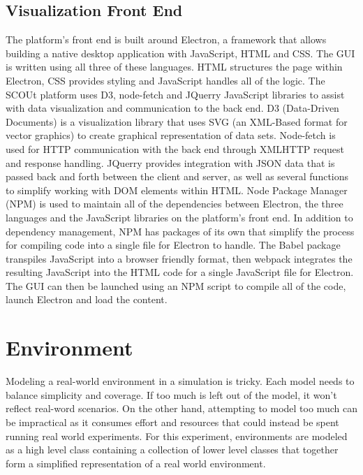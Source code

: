 \subsection{Visualization Front End} \label{subsec:front_end}
The platform's front end is built around Electron,  a framework that allows building a native desktop application with JavaScript, HTML and CSS.
The GUI is written using all three of these languages.
HTML structures the page within Electron, CSS provides styling and JavaScript handles all of the logic.
The SCOUt platform uses D3, node-fetch and JQuerry JavaScript libraries to assist with data visualization and communication to the back end. 
D3 (Data-Driven Documents) is a visualization library that uses SVG (an XML-Based format for vector graphics) to create graphical representation of data sets.
Node-fetch is used for HTTP communication with the back end through XMLHTTP request and response handling.
JQuerry provides integration with JSON data that is passed back and forth between the client and server, as well as several functions to simplify working with DOM elements within HTML.
Node Package Manager (NPM)  is used to maintain all of the dependencies between Electron, the three languages and the JavaScript libraries on the platform's front end.
In addition to dependency management, NPM has packages of its own that simplify the process for compiling code into a single file for Electron to handle.
The Babel  package transpiles JavaScript into a browser friendly format, then webpack  integrates the resulting JavaScript into the HTML code for a single JavaScript file for Electron.
The GUI can then be launched using an NPM script to compile all of the code, launch Electron and load the content.



\section{Environment} \label{sec:environment}
Modeling a real-world environment in a simulation is tricky.
Each model needs to balance simplicity and coverage.
If too much is left out of the model, it won’t reflect real-word scenarios.
On the other hand, attempting to model too much can be impractical as it consumes effort and resources that could instead be spent running real world experiments.
For this experiment, environments are modeled as a high level class containing a collection of lower level classes that together form a simplified representation of a real world environment.

